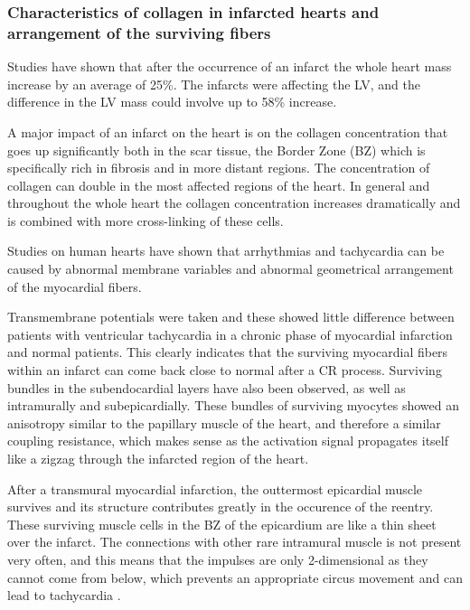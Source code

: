 \subsubsection{Characteristics of collagen in infarcted hearts and arrangement of the surviving fibers} \label{surviving_fibers}

Studies \cite{mccormick1994regional} have shown that after the occurrence of an infarct the whole heart mass increase by an average of 25\%. The infarcts were affecting the LV, and the difference in the LV mass could involve up to 58\% increase.

A major impact of an infarct on the heart is on the collagen concentration that goes up significantly both in the scar tissue, the Border Zone (BZ) which is specifically rich in fibrosis and in more distant regions. The concentration of collagen can double in the most affected regions of the heart. In general and throughout the whole heart the collagen concentration increases dramatically and is combined with more cross-linking of these cells.

Studies on human hearts \cite{de1990ventricular} have shown that arrhythmias and tachycardia can be caused by abnormal membrane variables and abnormal geometrical arrangement of the myocardial fibers.

Transmembrane potentials were taken and these showed little difference between patients with ventricular tachycardia in a chronic phase of myocardial infarction and normal patients. This clearly indicates that the surviving myocardial fibers within an infarct can come back close to normal after a CR process. Surviving bundles in the subendocardial layers have also been observed, as well as intramurally and subepicardially. These bundles of surviving myocytes showed an anisotropy similar to the papillary muscle of the heart, and therefore a similar coupling resistance, which makes sense as the activation signal propagates itself like a zigzag through the infarcted region of the heart.

After a transmural myocardial infarction, the outtermost epicardial muscle survives and its structure contributes greatly in the occurence of the reentry. These surviving muscle cells in the BZ of the epicardium are like a thin sheet over the infarct. The connections with other rare intramural muscle is not present very often, and this means that the impulses are only 2-dimensional as they cannot come from below, which prevents an appropriate circus movement and can lead to tachycardia \cite{ursell1985structural}.

